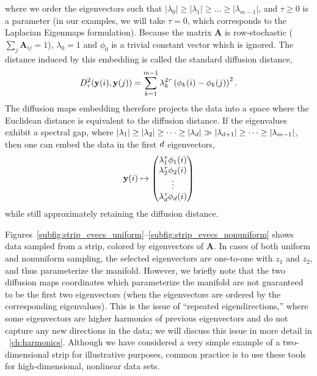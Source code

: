 %
where we order the eigenvectors such that $|\lambda_0| \ge |\lambda_1| \ge \dots \ge |\lambda_{m-1}|$, and $\tau \ge 0$ is a parameter (in our examples, we will take $\tau=0$, which corresponds to the Laplacian Eigenmaps formulation).
%
Because the matrix $\mathbf{A}$ is row-stochastic ($\sum_j \mathbf{A}_{ij} = 1$),  $\lambda_0 = 1$ and $\phi_0$ is a trivial constant vector which is ignored.
%
The distance induced by this embedding is called the standard diffusion distance,
%
\begin{equation}
D^2_\tau(\mathbf{y}(i), \mathbf{y}(j)) = \sum_{k=1}^{m-1} \lambda_k^{2 \tau} \left( \phi_k(i) - \phi_k(j)  \right)^2.
\end{equation}
%
The diffusion maps embedding therefore projects the data into a space where the Euclidean distance is equivalent to the diffusion distance.
%
If the eigenvalues exhibit a spectral gap, where $|\lambda_1| \ge |\lambda_2| \ge \dots \ge |\lambda_d | \gg |\lambda_{d+1} | \ge \dots \ge |\lambda_{m-1}|$, then one can embed the data in the first $d$ eigenvectors,
\begin{equation} \label{eq:dmaps_embed_reduced}
\mathbf{y}(i) \mapsto
\begin{pmatrix}
\lambda_1^\tau \phi_1(i) \\
\lambda_2^\tau \phi_2(i) \\
\vdots \\
\lambda_{d}^\tau  \phi_{d}(i)
\end{pmatrix}
\end{equation}
%
while still approximately retaining the diffusion distance.

Figures~\ref{subfig:strip_evecs_uniform}--\ref{subfig:strip_evecs_nonuniform} shows data sampled from a strip, colored by eigenvectors of $\mathbf{A}$.
%
In cases of both uniform and nonuniform sampling, the selected eigenvectors are one-to-one with $z_1$ and $z_2$, and thus parameterize the manifold.
%
However, we briefly note that the two diffusion maps coordinates which parameterize the manifold are not guaranteed to be the first two eigenvectors (when the eigenvectors are ordered by the corresponding eigenvalues).
%
This is the issue of ``repeated eigendirections,'' where some eigenvectors are higher harmonics of previous eigenvectors and do not capture any new directions in the data; we will discuss this issue in more detail in \chap~\ref{ch:harmonics}.
%
%
Although we have considered a very simple example of a two-dimensional strip for illustrative purposes, common practice is to use these tools for high-dimensional, nonlinear data sets.

